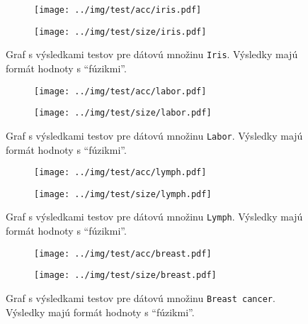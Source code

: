 \begin{figure}[h]
\centering
\begin{subfigure}[b]{0.45\textwidth}
\texttt{[image: ../img/test/acc/iris.pdf]}
\caption{}
\end{subfigure}
\qquad
\begin{subfigure}[b]{0.45\textwidth}
\texttt{[image: ../img/test/size/iris.pdf]}
\caption{}
\end{subfigure}
\caption{Graf s výsledkami testov pre dátovú množinu \texttt{Iris}. Výsledky majú formát hodnoty s ``fúzikmi''.}\label{fig:graph5}
\end{figure}

\begin{figure}[h]
\centering
\begin{subfigure}[b]{0.45\textwidth}
\texttt{[image: ../img/test/acc/labor.pdf]}
\caption{}
\end{subfigure}
\qquad
\begin{subfigure}[b]{0.45\textwidth}
\texttt{[image: ../img/test/size/labor.pdf]}
\caption{}
\end{subfigure}
\caption{Graf s výsledkami testov pre dátovú množinu \texttt{Labor}. Výsledky majú formát hodnoty s ``fúzikmi''.}\label{fig:graph6}
\end{figure}

\begin{figure}[h]
\centering
\begin{subfigure}[b]{0.45\textwidth}
\texttt{[image: ../img/test/acc/lymph.pdf]}
\caption{}
\end{subfigure}
\qquad
\begin{subfigure}[b]{0.45\textwidth}
\texttt{[image: ../img/test/size/lymph.pdf]}
\caption{}
\end{subfigure}
\caption{Graf s výsledkami testov pre dátovú množinu \texttt{Lymph}. Výsledky majú formát hodnoty s ``fúzikmi''.}\label{fig:graph7}
\end{figure}

\begin{figure}[t]
\centering
\begin{subfigure}[b]{0.45\textwidth}
\texttt{[image: ../img/test/acc/breast.pdf]}
\caption{}
\end{subfigure}
\qquad
\begin{subfigure}[b]{0.45\textwidth}
\texttt{[image: ../img/test/size/breast.pdf]}
\caption{}
\end{subfigure}
\caption{Graf s výsledkami testov pre dátovú množinu \texttt{Breast cancer}. Výsledky majú formát hodnoty s ``fúzikmi''.}\label{fig:graph8}
\end{figure}